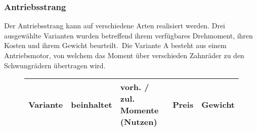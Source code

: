\subsubsection{Antriebsstrang}

Der Antriebsstrang kann auf verschiedene Arten realisiert werden. Drei ausgewählte Varianten wurden betreffend ihrem verfügbares Drehmoment, ihren Kosten und ihrem Gewicht beurteilt.\
Die Variante A besteht aus einem Antriebsmotor, von welchem das Moment über verschieden Zahnräder zu den Schwungrädern übertragen wird.      





\begin{figure}[h!]
    \begin{tabular}{p{0.5cm}p{0.8cm}rp{3cm}rr}
    \textbf{Variante} & \multicolumn{2}{r}{\textbf{beinhaltet}} & \textbf{vorh. / zul. Momente (Nutzen)} & \textbf{Preis} & \textbf{Gewicht} \\\hline


\end{tabular}
\end{figure}
